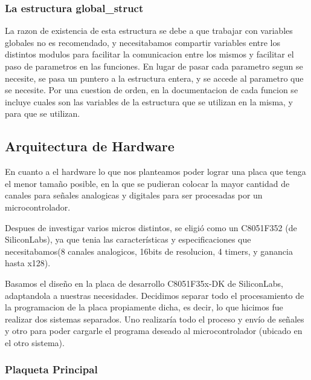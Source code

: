 \documentclass[a4paper]{article}
\begin{document}

\subsubsection{La estructura global\_struct} %
\label{ssub:la_estructura_global_struct}

La razon de existencia de esta estructura se debe a que trabajar con variables globales no es recomendado, y necesitabamos compartir variables entre los distintos modulos para facilitar la comunicacion entre los mismos y facilitar el paso de parametros en las funciones. En lugar de pasar cada parametro segun se necesite, se pasa un puntero a la estructura entera, y se accede al parametro que se necesite. Por una cuestion de orden, en la documentacion de cada funcion se incluye cuales son las variables de la estructura que se utilizan en la misma, y para que se utilizan.


\subsection{Arquitectura de Hardware} %
\label{sub:hardware}

En cuanto a el hardware lo que nos planteamos poder lograr una placa que tenga el menor tamaño posible, en la que se pudieran colocar la mayor cantidad de canales para señales analogicas y digitales para ser procesadas por un microcontrolador.

Despues de investigar varios micros distintos, se eligió como un C8051F352 (de SiliconLabs), ya que tenia las características y especificaciones que necesitabamos(8 canales analogicos, 16bits de resolucion, 4 timers, y ganancia hasta x128).

 Basamos el diseño en la placa de desarrollo C8051F35x-DK de SiliconLabs, adaptandola a nuestras necesidades. Decidimos separar todo el procesamiento de la programacion de la placa propiamente dicha, es decir, lo que hicimos fue realizar dos sistemas separados. Uno realizaría todo el proceso y envío de señales y otro para poder cargarle el programa deseado al microcontrolador (ubicado en el otro sistema).
 
\subsubsection{Plaqueta Principal} %
\label{ssub:plaqueta principal}
\end{document}
